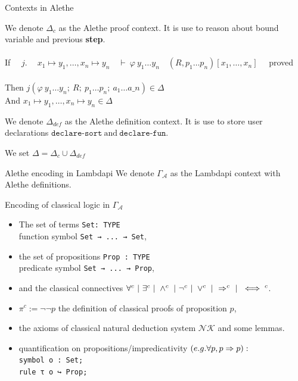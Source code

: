 \documentclass[aspectratio=169,xcolor={dvipsnames}]{beamer}
\begin{document}
\AtBeginSection[]
{
  \begin{frame}
    \tableofcontents[currentsection]
  \end{frame}
}


\begin{frame}{Contexts in Alethe}
\begin{definition}
    We denote $\Delta_c$ as the Alethe proof context.
    It is use to reason about bound variable and previous \textbf{step}.\\\\
    If $\quad j.\quad ~ x_1 \mapsto y_1, \dots , x_n \mapsto y_n \quad \vdash~ \varphi~y_1 \dots y_n \quad (R, p_1 \dots p_n)[x_1, \dots, x_n]\quad$ proved\\\\
    Then $j(\varphi~y_1 \dots y_n;~R;~p_1 \dots p_n;~a_1 \dots a\_n) \in \Delta$\\
    And $x_1 \mapsto y_1, \dots , x_n \mapsto y_n \in \Delta$
\end{definition}
\vfill
\begin{definition}
    We denote $\Delta_{def}$ as the Alethe definition context.
    It is use to store user declarations $\texttt{declare-sort}~\text{and}~\texttt{declare-fun}$.\\
\end{definition}
\begin{definition} We set $\Delta = \Delta_c \cup \Delta_{def}$ \end{definition}
\end{frame}

\begin{frame}[t, fragile]{Alethe encoding in Lambdapi}
We denote $\Gamma_\mathcal{A}$ as the Lambdapi context with Alethe definitions.
\begin{block}{Encoding of classical logic in $\Gamma_\mathcal{A}$ \footnotemark[1]}
\begin{itemize}
\item The set of terms \lstinline{Set: TYPE}\\
    function symbol \lstinline{Set → ... → Set},
\item the set of propositions \lstinline{Prop : TYPE}\\
    predicate symbol \lstinline{Set → ... → Prop},
\item and the classical connectives $\forall^c ~|~ \exists^c ~|~ \land^c ~|~ \neg^c ~|~ \lor^c ~|~ \Rightarrow^c ~|~ \iff^c$.
\item $\pi^c := \neg \neg p$ the definition of classical proofs of proposition $p$,
\item the axioms of classical natural deduction system $\mathcal{NK}$ and some lemmas.
\item quantification on propositions/impredicativity $(e.g. \forall p, p \Rightarrow p):$\\
\lstinline{symbol o : Set;}\\
\lstinline{rule τ o ↪ Prop;}
\end{itemize}
\end{block}
\end{frame}
\end{document}
